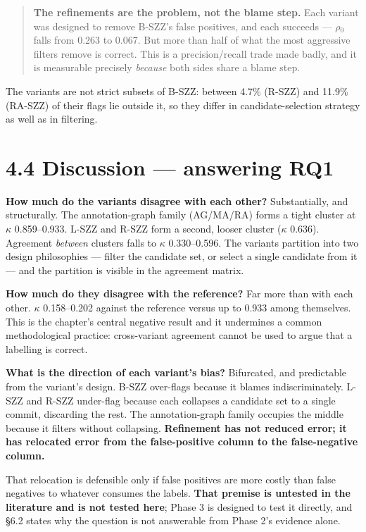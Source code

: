 \begin{quote}
\textbf{The refinements are the problem, not the blame step.} Each
variant was designed to remove B-SZZ's false positives, and each
succeeds --- \ensuremath{\rho}\ensuremath{_0} falls from 0.263 to 0.067. But more than half of what
the most aggressive filters remove is correct. This is a
precision/recall trade made badly, and it is measurable precisely
\emph{because} both sides share a blame step.
\end{quote}

The variants are not strict subsets of B-SZZ: between 4.7\% (R-SZZ) and
11.9\% (RA-SZZ) of their flags lie outside it, so they differ in
candidate-selection strategy as well as in filtering.

\section{4.4 Discussion --- answering
RQ1}\label{discussion-answering-rq1}

\textbf{How much do the variants disagree with each other?}
Substantially, and structurally. The annotation-graph family (AG/MA/RA)
forms a tight cluster at \ensuremath{\kappa} 0.859--0.933. L-SZZ and R-SZZ form a second,
looser cluster (\ensuremath{\kappa} 0.636). Agreement \emph{between} clusters falls to \ensuremath{\kappa}
0.330--0.596. The variants partition into two design philosophies ---
filter the candidate set, or select a single candidate from it --- and
the partition is visible in the agreement matrix.

\textbf{How much do they disagree with the reference?} Far more than
with each other. \ensuremath{\kappa} 0.158--0.202 against the reference versus up to 0.933
among themselves. This is the chapter's central negative result and it
undermines a common methodological practice: cross-variant agreement
cannot be used to argue that a labelling is correct.

\textbf{What is the direction of each variant's bias?} Bifurcated, and
predictable from the variant's design. B-SZZ over-flags because it
blames indiscriminately. L-SZZ and R-SZZ under-flag because each
collapses a candidate set to a single commit, discarding the rest. The
annotation-graph family occupies the middle because it filters without
collapsing. \textbf{Refinement has not reduced error; it has relocated
error from the false-positive column to the false-negative column.}

That relocation is defensible only if false positives are more costly
than false negatives to whatever consumes the labels. \textbf{That
premise is untested in the literature and is not tested here}; Phase 3
is designed to test it directly, and \S{}6.2 states why the question is not
answerable from Phase 2's evidence alone.

